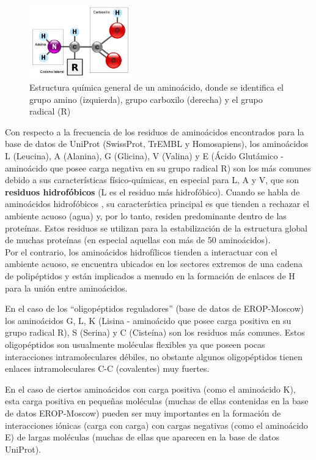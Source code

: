 \begin{figure}[h]
    \centering
    \includegraphics[width=0.4\textwidth]{./images/estructura2.jpeg}
    \caption{Estructura química general de un aminoácido, donde se identifica el grupo amino (izquierda), grupo carboxilo (derecha) y el grupo radical (R)}
    \label{fig:imple3}
\end{figure}

Con respecto a la frecuencia de los residuos de aminoácidos encontrados para la base de datos de UniProt (SwissProt, TrEMBL y Homosapiens), los aminoácidos L (Leucina), A (Alanina), G (Glicina), V (Valina) y E (Ácido Glutámico - aminoácido que posee carga negativa en su grupo radical R) son los más comunes debido a sus características físico-químicas, en especial para L, A y V, que son \textbf{residuos hidrofóbicos} (L es el residuo más hidrofóbico). Cuando se habla de aminoácidos hidrofóbicos \cite{quimicaaminoacidos}, su característica principal es que tienden a rechazar el ambiente acuoso (agua) y, por lo tanto, residen predominante dentro de las proteínas. Estos residuos se utilizan para la estabilización de la estructura global de muchas proteínas (en especial aquellas con más de 50 aminoácidos).\\
Por el contrario, los aminoácidos hidrofílicos tienden a interactuar con el ambiente acuoso, se encuentra ubicados en los sectores extremos de una cadena de polipéptidos y están implicados a menudo en la formación de enlaces de H para la unión entre aminoácidos.

En el caso de los ``oligopéptidos reguladores'' (base de datos de EROP-Moscow) los aminoácidos G, L, K (Lisina - aminoácido que posee carga positiva en su grupo radical R), S (Serina) y C (Cisteína) son los residuos más comunes. Estos oligopéptidos \cite{zamyatnin3} son usualmente moléculas flexibles ya que poseen pocas interacciones intramoleculares débiles, no obstante algunos oligopéptidos tienen enlaces intramoleculares C-C (covalentes) muy fuertes. 

En el caso de ciertos aminoácidos con carga positiva (como el aminoácido K), esta carga positiva en pequeñas moléculas (muchas de ellas contenidas en la base de datos EROP-Moscow) pueden ser muy importantes en la formación de interacciones iónicas (carga con carga) con cargas negativas (como el aminoácido E) de largas moléculas (muchas de ellas que aparecen en la base de datos UniProt).